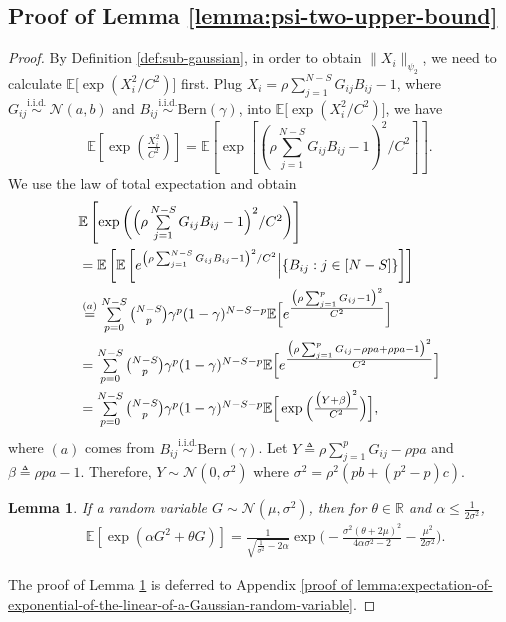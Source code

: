 \documentclass[lettersize,journal]{IEEEtran}
\newcommand{\gaussian}[2]{\mathcal{N}(#1, #2)}
\newcommand{\RR}{\mathbb{R}}
\newcommand{\ex}[1]{\mathbb{E}\left[#1\right]}
\newcommand{\psitwo}[1]{\|#1\|_{\psi_2} }
\newtheorem{lemma}{Lemma}
\begin{document}
{\subsection{Proof of Lemma \ref{lemma:psi-two-upper-bound}}
\begin{proof}
\label{proof of lemma:psi-two-upper-bound}
    By Definition \ref{def:sub-gaussian}, in order to obtain $\psitwo{X_i}$, we need to calculate $\mathbb{E}\big[{\exp{\left(X_i^2/C^2\right)\big]}}$ first. Plug $X_i =\rho \sum_{j=1}^{N-S} G_{ij}B_{ij}-1$, where $G_{ij} \overset{\text{i.i.d.}}{\sim}~\gaussian{a}{b}$ and $B_{ij}\overset{\text{i.i.d.}}{\sim}\text{Bern}(\gamma)$, into $\mathbb{E}\big[{\exp{\left(X_i^2/C^2\right)\big]}}$, we have
    \begin{equation*}
        \ex{\exp{\left(\tfrac{X_i^2}{C^2}\right)}} =\ex{\exp{\left[\left(\textstyle{\rho\sum_{j=1}^{N-S}G_{ij}B_{ij}-1}\right)^2/C^2\right]}}.
    \end{equation*}
    We use the law of total expectation and obtain
    \begin{align*}&\ex{\exp{\bigg(\Big(\textstyle{\rho\sum\limits_{j=1}^{N-S}G_{ij}B_{ij}-1}\Big)^2/C^2\bigg)}}\\
        &=\ex{\ex{e^{\left({\rho\sum_{j=1}^{N-S}G_{ij}B_{ij}-1}\right)^2/C^2}\Big|\{B_{ij}:j \in [N-S]\}}}\\
        &\overset{(a)}{=} \textstyle\sum\limits_{p=0}^{N-S}\tbinom{N-S}{p}\gamma^p(1-\gamma)^{N-S-p}\mathbb{E}\Big[{e^{\tfrac{\big(\rho\sum_{j=1}^{p}G_{ij}-1\big)^2}{C^2}}}\Big]\\
        &
        = \textstyle\sum\limits_{p=0}^{N-S}\tbinom{N-S}{p}\gamma^p(1-\gamma)^{N-S-p} \mathbb{E}\Big[e^{\tfrac{\big(\rho\sum_{j=1}^{p}G_{ij}-\rho pa+\rho pa-1\big)^2}{C^2}}\Big]\\
        &
        = \textstyle\sum\limits_{p=0}^{N-S}\tbinom{N-S}{p}\gamma^p(1-\gamma)^{N-S-p} \mathbb{E}\Big[\exp\Big({\tfrac{\big(Y+\beta\big)^2}{C^2}}\Big)\Big],
    \end{align*}
    where $(a)$ comes from $B_{ij}\overset{\text{i.i.d.}}{\sim}\text{Bern}(\gamma)$. Let $Y \triangleq \rho\sum\limits_{j=1}^{p}G_{ij}-\rho pa$ and $\beta \triangleq \rho pa-1$. 
    Therefore, $Y\sim \gaussian{0}{\sigma^2}$ where $\sigma^2 = \rho^2(pb+(p^2-p)c)$.

\begin{lemma}
    \label{lemma:expectation-of-exponential-of-the-linear-of-a-Gaussian-random-variable}
If a random variable $G\sim \gaussian{\mu}{\sigma^2}$, then for $\theta \in \RR$ and $\alpha\leq \frac{1}{2\sigma^2}$,
\begin{align*}
    &\ex{\exp{(\alpha G^2 + \theta G)}}= \tfrac{1}{\sqrt{\frac{1}{\sigma^2} - 2\alpha}}\exp{\Big(- \tfrac{\sigma^2(\theta+2\mu)^2}{4\alpha \sigma^2-2} - \tfrac{\mu^2}{2\sigma^2}\Big)}.
\end{align*}
\end{lemma}
The proof of Lemma \ref{lemma:expectation-of-exponential-of-the-linear-of-a-Gaussian-random-variable} is deferred to Appendix \ref{proof of lemma:expectation-of-exponential-of-the-linear-of-a-Gaussian-random-variable}.


\end{proof}}
\end{document}
